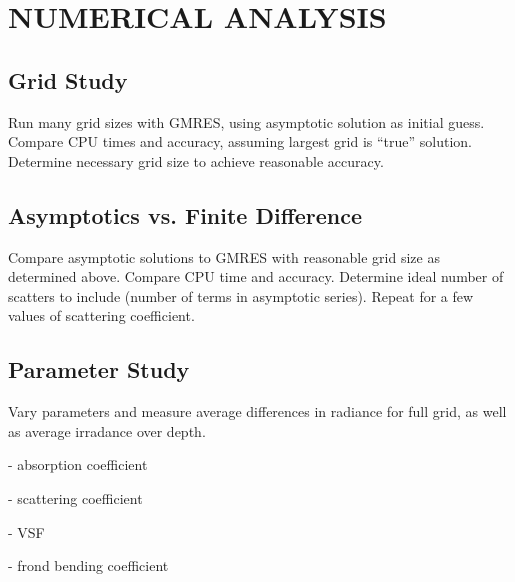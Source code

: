 \chapter{NUMERICAL ANALYSIS} \label{ch:model_analysis}

\section{Grid Study}
Run many grid sizes with GMRES, using asymptotic solution as initial guess.
Compare CPU times and accuracy, assuming largest grid is ``true'' solution.
Determine necessary grid size to achieve reasonable accuracy.

\section{Asymptotics vs. Finite Difference}
Compare asymptotic solutions to GMRES with reasonable grid size as determined
above. Compare CPU time and accuracy. Determine ideal number of scatters to
include (number of terms in asymptotic series). Repeat for a few values of
scattering coefficient.

\section{Parameter Study}
Vary parameters and measure average differences in radiance for full grid, as
well as average irradance over depth.

- absorption coefficient

- scattering coefficient

- VSF

- frond bending coefficient